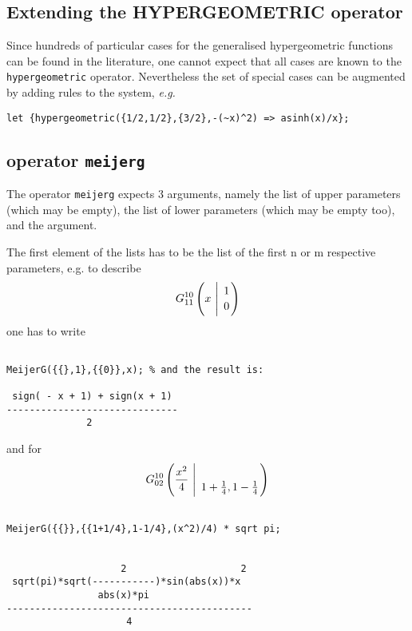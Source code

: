\subsection{Extending the HYPERGEOMETRIC operator}

Since hundreds of particular cases for the generalised hypergeometric
functions can be found in the literature, one cannot expect that all
cases are known to the \texttt{hypergeometric} operator.
Nevertheless the set of special cases can be augmented by adding
rules to the \REDUCE{} system, {\em e.g.}
\begin{verbatim}
let {hypergeometric({1/2,1/2},{3/2},-(~x)^2) => asinh(x)/x};
\end{verbatim}


\subsection{\REDUCE{} operator {\tt meijerg}}
\hypertarget{operator:MEIJERG}{}

The operator \texttt{meijerg} expects 3 arguments, namely the 
list of upper parameters (which may be empty), the list of lower
parameters (which may be empty too), and the argument.

The first element of the lists has to be the list of the
first n or m respective parameters, e.g. to describe 
\begin{displaymath}
G_{1 1}^{1 0} \left( x \  \Bigg\vert \  {1 \atop 0} \right)
\end{displaymath}
one has to write 
\begin{verbatim}

MeijerG({{},1},{{0}},x); % and the result is:

 sign( - x + 1) + sign(x + 1)
------------------------------
              2

\end{verbatim}
and for
\begin{displaymath}
G_{0 2}^{1 0} \left( \frac{x^2}{4} \  \Bigg\vert \ {\atop  {1+ \frac{1}{4} },
{1-\frac{1}{4}}} \right)
\end{displaymath}
\begin{verbatim}

MeijerG({{}},{{1+1/4},1-1/4},(x^2)/4) * sqrt pi;


                    2                    2
 sqrt(pi)*sqrt(-----------)*sin(abs(x))*x
                abs(x)*pi
-------------------------------------------
                     4


\end{verbatim}


